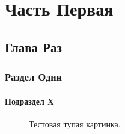 \documentclass[a4paper,12pt]{report} %
\begin{document}
    \begin{spacing}{0.9}
        \tableofcontents %
    \end{spacing}
    \part{Часть Первая}
    \chapter{Глава Раз}
    \section{Раздел Один}
    \subsection{Подраздел Х}
    \begin{figure}[h]
        \caption{Тестовая тупая картинка.}
        \label{img:image}
    \end{figure}
\end{document}
